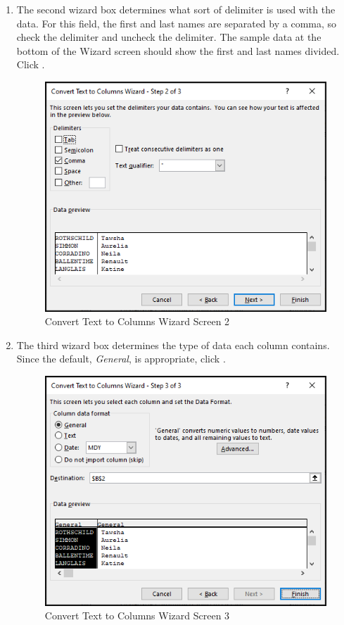 \begin{enumbox}
\begin{enumerate}
		\item The second wizard box determines what sort of delimiter is used with the data. For this field, the first and last names are separated by a comma, so check the  delimiter and uncheck the  delimiter. The sample data at the bottom of the Wizard screen should show the first and last names divided. Click .
	
		\begin{figure}[H]
			\centering
			\includegraphics[width=\maxwidth{.75\linewidth}]{gfx/ch09_fig31}
			\caption{Convert Text to Columns Wizard Screen 2}
			\label{09:fig31}
		\end{figure}
	
		\item The third wizard box determines the type of data each column contains. Since the default, \textit{General}, is appropriate, click .
	
		\begin{figure}[H]
			\centering
			\includegraphics[width=\maxwidth{.75\linewidth}]{gfx/ch09_fig32}
			\caption{Convert Text to Columns Wizard Screen 3}
			\label{09:fig32}
		\end{figure}
	

\end{enumerate}
\end{enumbox}
